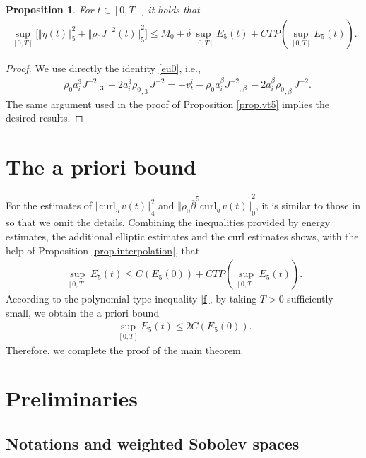 \documentclass[12pt,twoside,reqno]{amsart}
\numberwithin{equation}{section}
\newtheorem{proposition}[theorem]{Proposition}
\theoremstyle{definition}
\theoremstyle{remark}
\begin{document}
\begin{proposition}
  For $t\in [0,T]$, it holds that
  \begin{align*}
    \sup_{[0,T]}\Big[{\Vert{ \eta(t)}\Vert}_5^2+{\Vert{{\rho_0}  J^{-2}(t)}\Vert}_5^2\Big]{\leqslant}  M_0+\delta \sup_{[0,T]} E_5(t)+CTP(\sup_{[0,T]}E_5(t)).
  \end{align*}
\end{proposition}

\begin{proof}
  We use directly the identity \eqref{eu0}, i.e.,
  \begin{align*}
&{\rho_0} a_i^3 {{{J^{-2}}}_{,{3}}\,}+2 a_i^3{{\rho_0}_{,{3}}\,}J^{-2}
=-v_t^i-{\rho_0} a_i^\beta{{{J^{-2}}}_{,{\beta}}\,}-2 a_i^\beta{{\rho_0}_{,{\beta}}\,}J^{-2}.
\end{align*}
The same argument used in the proof of Proposition \ref{prop.vt5} implies the desired results.
\end{proof}

\section{The a priori bound}\label{sec.9}

For the estimates of ${\Vert{{\mathrm{curl}_\eta\,} v(t)}\Vert}_4^2$ and ${\Vert{{\rho_0}{\overline{\partial}}^5{\mathrm{curl}_\eta\,} v(t)}\Vert}_0^2$, it is similar to those in \cite{CLS10} so that we omit the details. Combining the inequalities provided by energy estimates, the additional elliptic estimates and the curl estimates shows, with the help of Proposition \ref{prop.interpolation}, that
\begin{align*}
  \sup_{[0,T]}E_5(t){\leqslant} C(E_5(0))+CTP(\sup_{[0,T]}E_5(t)).
\end{align*}
According to the polynomial-type inequality \eqref{f}, by taking $T>0$ sufficiently small, we obtain the a priori bound
\begin{align*}
  \sup_{[0,T]}E_5(t){\leqslant} 2C(E_5(0)).
\end{align*}
Therefore, we complete the proof of the main theorem.

\appendix

\section{Preliminaries}\label{sec.pre}

\subsection{Notations and weighted Sobolev spaces}\label{sec.2}
\end{document}
